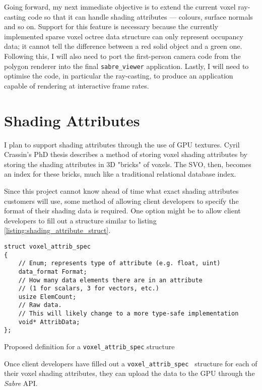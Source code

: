 Going forward, my next immediate objective is to extend the current voxel ray-casting code so that it can handle shading attributes --- colours, surface normals and so on. Support for this feature is necessary because the currently implemented sparse voxel octree data structure can only represent occupancy data; it cannot tell the difference between a red solid object and a green one. Following this, I will also need to port the first-person camera code from the polygon renderer into the final \texttt{sabre\_viewer} application. Lastly, I will need to optimise the code, in particular the ray-casting, to produce an application capable of rendering at interactive frame rates.

\section{Shading Attributes}
I plan to support shading attributes through the use of GPU textures. Cyril Crassin's PhD thesis \autocite{crassin2009gigavoxels} describes a method of storing voxel shading attributes by storing the shading attributes in 3D "bricks" of voxels. The SVO, then, becomes an index for these bricks, much like a traditional relational database index. 

Since this project cannot know ahead of time what exact shading attributes customers will use, some method of allowing client developers to specify the format of their shading data is required. One option might be to allow client developers to fill out a structure similar to listing \ref{listing:shading_attribute_struct}.

\begin{listing}[ht]
\begin{verbatim}
struct voxel_attrib_spec
{
    // Enum; represents type of attribute (e.g. float, uint)
    data_format Format; 
    // How many data elements there are in an attribute 
    // (1 for scalars, 3 for vectors, etc.)
    usize ElemCount; 
    // Raw data. 
    // This will likely change to a more type-safe implementation
    void* AttribData; 
};
\end{verbatim}
\caption{Proposed definition for a \texttt{voxel\_attrib\_spec} structure}
\label{listing:shading_attribute_struct}
\end{listing}

Once client developers have filled out a \texttt{voxel_attrib_spec   } structure for each of their voxel shading attributes, they can upload the data to the GPU through the \textit{Sabre} API.

